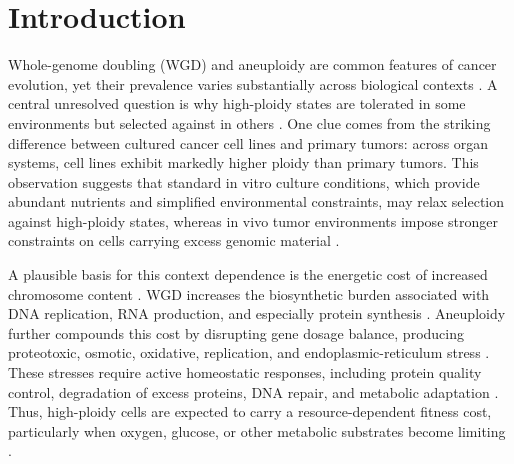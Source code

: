 \documentclass[11pt]{article}
\begin{document}
\section*{Introduction}

Whole-genome doubling (WGD) and aneuploidy are common features of cancer evolution, yet their prevalence varies substantially across biological contexts \cite{bielski_genome_2018,davoli_tumor_2017,salehi_clonal_2021}. A central unresolved question is why high-ploidy states are tolerated in some environments but selected against in others \cite{nowicka_interactions_2025,beck_energetics_2025}. One clue comes from the striking difference between cultured cancer cell lines and primary tumors: across organ systems, cell lines exhibit markedly higher ploidy than primary tumors. This observation suggests that standard in vitro culture conditions, which provide abundant nutrients and simplified environmental constraints, may relax selection against high-ploidy states, whereas in vivo tumor environments impose stronger constraints on cells carrying excess genomic material \cite{nowicka_interactions_2025,beck_energetics_2025}.

A plausible basis for this context dependence is the energetic cost of increased chromosome content \cite{donovan_hyperdiploid_2014,nowicka_interactions_2025,beck_energetics_2025}. WGD increases the biosynthetic burden associated with DNA replication, RNA production, and especially protein synthesis \cite{donovan_hyperdiploid_2014,nowicka_interactions_2025,beck_energetics_2025}. Aneuploidy further compounds this cost by disrupting gene dosage balance, producing proteotoxic, osmotic, oxidative, replication, and endoplasmic-reticulum stress \cite{santaguida_chromosome_2017,sheltzer_single-chromosome_2017,kuznetsova_chromosomal_2015}. These stresses require active homeostatic responses, including protein quality control, degradation of excess proteins, DNA repair, and metabolic adaptation \cite{santaguida_chromosome_2017,sheltzer_single-chromosome_2017,kuznetsova_chromosomal_2015,beck_energetics_2025}. Thus, high-ploidy cells are expected to carry a resource-dependent fitness cost, particularly when oxygen, glucose, or other metabolic substrates become limiting \cite{nowicka_interactions_2025,beck_energetics_2025}.
\end{document}
